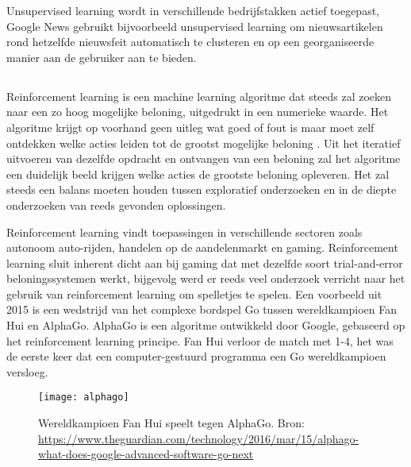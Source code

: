 Unsupervised learning wordt in verschillende bedrijfstakken actief toegepast, Google News gebruikt bijvoorbeeld unsupervised learning om nieuwsartikelen rond hetzelfde nieuwsfeit automatisch te clusteren en op een georganiseerde manier aan de gebruiker aan te bieden.

\subsection{}
\label{sec:reinforcement-learning}
Reinforcement learning is een machine learning algoritme dat steeds zal zoeken naar een zo hoog mogelijke beloning, uitgedrukt in een numerieke waarde. Het algoritme krijgt op voorhand geen uitleg wat goed of fout is maar moet zelf ontdekken welke acties leiden tot de grootst mogelijke beloning \autocite{Sutton2018}. Uit het iteratief uitvoeren van dezelfde opdracht en ontvangen van een beloning zal het algoritme een duidelijk beeld krijgen welke acties de grootste beloning opleveren. Het zal steeds een balans moeten houden tussen exploratief onderzoeken en in de diepte onderzoeken van reeds gevonden oplossingen. 

Reinforcement learning vindt toepassingen in verschillende sectoren zoals autonoom auto-rijden, handelen op de aandelenmarkt en gaming. Reinforcement learning sluit inherent dicht aan bij gaming dat met dezelfde soort trial-and-error beloningssystemen werkt, bijgevolg werd er reeds veel onderzoek verricht naar het gebruik van reinforcement learning om spelletjes te spelen. Een voorbeeld uit 2015 is een wedstrijd van het complexe bordspel Go tussen wereldkampioen Fan Hui en AlphaGo. AlphaGo is een algoritme ontwikkeld door Google, gebaseerd op het reinforcement learning principe. Fan Hui verloor de match met 1-4, het was de eerste keer dat een computer-gestuurd programma een Go wereldkampioen versloeg.

\begin{figure}
    \centering
    \texttt{[image: alphago]}
    \caption{Wereldkampioen Fan Hui speelt tegen AlphaGo. Bron: \url{https://www.theguardian.com/technology/2016/mar/15/alphago-what-does-google-advanced-software-go-next}}
    \label{fig:alphago}
\end{figure}

